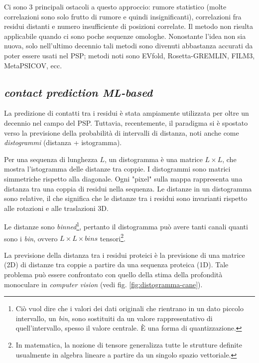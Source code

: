{	\par Ci sono 3 principali ostacoli a questo approccio: rumore statistico (molte correlazioni sono solo frutto di rumore e quindi insignificanti), correlazioni fra residui distanti e numero insufficiente di posizioni correlate. Il metodo non risulta applicabile quando ci sono poche sequenze omologhe. Nonostante l'idea non sia nuova, solo nell'ultimo decennio tali metodi sono divenuti abbastanza accurati da poter essere usati nel PSP; metodi noti sono EVfold, Rosetta-GREMLIN, FILM3, MetaPSICOV, ecc.
	
}

\subsection{\textit{contact prediction ML-based}}

La predizione di contatti tra i residui è stata ampiamente utilizzata per oltre un decennio nel campo del PSP. Tuttavia, recentemente, il paradigma si è spostato verso la previsione della probabilità di intervalli di distanza, noti anche come \textit{distogrammi} (distanza + istogramma). 

\par Per una sequenza di lunghezza $L$, un distogramma è una matrice $L \times L$, che mostra l'istogramma delle distanze tra coppie. I distogrammi sono matrici simmetriche rispetto alla diagonale. Ogni "pixel" sulla mappa rappresenta una distanza tra una coppia di residui nella sequenza. Le distanze in un distogramma sono relative, il che significa che le distanze tra i residui sono invarianti rispetto alle rotazioni e alle traslazioni 3D.

\par Le distanze sono \textit{binned}\footnote{Ciò vuol dire che i valori dei dati originali che rientrano in un dato piccolo intervallo, un \textit{bin}, sono sostituiti da un valore rappresentativo di quell'intervallo, spesso il valore centrale.  È una forma di quantizzazione.}, pertanto il distogramma può avere tanti canali quanti sono i \textit{bin}, ovvero $L\times L \times bins$ tensori\footnote{In matematica, la nozione di tensore generalizza tutte le strutture definite usualmente in algebra lineare a partire da un singolo spazio vettoriale.}.  \\

\par La previsione della distanza tra i residui proteici è la previsione di una matrice (2D) di distanze tra coppie a partire da una sequenza proteica (1D). Tale problema può essere confrontato con quello della stima della profondità monoculare in \textit{computer vision} (vedi fig. \ref{fig:distogramma-cane}).

